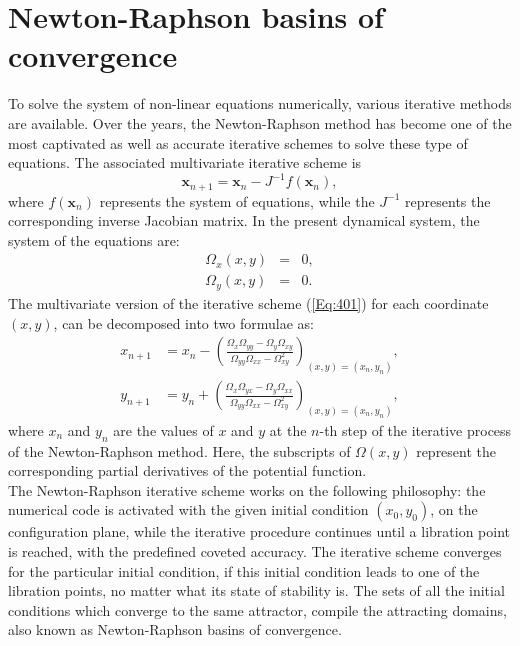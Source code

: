 \documentclass[preprint,fleqn,5p,numbers,sort&compress]{elsarticle}
\begin{document}
\section{Newton-Raphson basins of convergence}
\label{sec:4}
To solve the system of non-linear equations numerically, various iterative methods are available. Over the years, the Newton-Raphson method has become one of the most captivated as well as accurate iterative schemes to solve these type of equations. The associated multivariate iterative scheme is
\begin{equation}\label{Eq:401}
 \textbf{x}_{n+1}=\textbf{x}_n-J^{-1}f(\textbf{x}_n),
\end{equation}
where $f(\textbf{x}_n)$ represents the system of equations, while the $J^{-1}$  represents the corresponding inverse Jacobian matrix. In the present dynamical system, the system of the equations are:
\begin{subequations}
\begin{eqnarray}
\label{Eq:402a}
\Omega_{x}(x,y)&=&0,\\
\label{Eq:402b}
  \Omega_{y}(x,y)&=&0.
\end{eqnarray}
\end{subequations}
The multivariate version of the iterative scheme (\ref{Eq:401}) for each coordinate $(x, y)$, can be decomposed into two formulae as:
\begin{subequations}
\begin{eqnarray}
\label{Eq:403a}
x_{n+1} &= x_n - \left( \frac{\Omega_x \Omega_{yy} - \Omega_y \Omega_{xy}}{\Omega_{yy} \Omega_{xx} - \Omega^2_{xy}} \right)_{(x,y) = (x_n,y_n)}, \\
\label{Eq:403b}
y_{n+1} &= y_n + \left( \frac{\Omega_x \Omega_{yx} - \Omega_y \Omega_{xx}}{\Omega_{yy} \Omega_{xx} - \Omega^2_{xy}} \right)_{(x,y) = (x_n,y_n)},
\end{eqnarray}
\end{subequations}
where $x_n$ and $y_n$ are the values of $x$ and $y$ at the $n$-th step of the iterative process of the Newton-Raphson method. Here, the subscripts of $\Omega(x, y)$ represent the corresponding partial derivatives of the potential function.\\
The Newton-Raphson iterative scheme works on the following philosophy: the numerical code is activated with the given initial condition $(x_0, y_0)$, on the configuration plane, while the iterative procedure continues until a libration point is reached, with the predefined coveted accuracy. The iterative scheme converges for the particular initial condition, if this initial condition leads to one of the libration points, no matter what its state of stability is. The sets of all the initial conditions which converge to the same attractor, compile the attracting domains, also known as Newton-Raphson basins of convergence.\\
\end{document}
